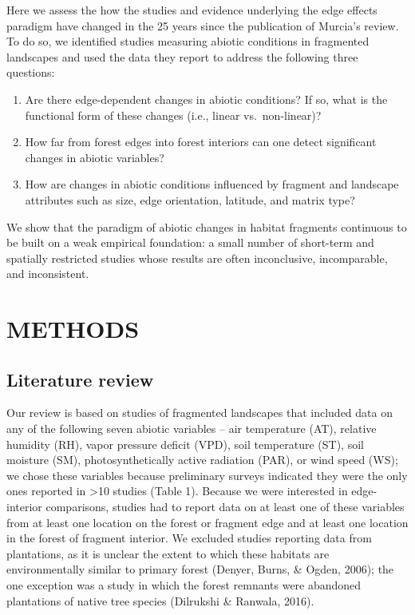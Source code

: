 \documentclass[
  man]{apa6}
\begin{document}
Here we assess the how the studies and evidence underlying the edge effects paradigm have changed in the 25 years since the publication of Murcia's review. To do so, we identified studies measuring abiotic conditions in fragmented landscapes and used the data they report to address the following three questions:\\
\bigskip  

\begin{enumerate}
\def\labelenumi{\arabic{enumi}.}
\item
  Are there edge-dependent changes in abiotic conditions? If so, what is the functional form of these changes (i.e., linear vs.~non-linear)?
\item
  How far from forest edges into forest interiors can one detect significant changes in abiotic variables?
\item
  How are changes in abiotic conditions influenced by fragment and landscape attributes such as size, edge orientation, latitude, and matrix type?
  \bigskip  
\end{enumerate}

We show that the paradigm of abiotic changes in habitat fragments continuous to be built on a weak empirical foundation: a small number of short-term and spatially restricted studies whose results are often inconclusive, incomparable, and inconsistent.

\section{METHODS}\label{methods}

\subsection{Literature review}\label{literature-review}

Our review is based on studies of fragmented landscapes that included data on any of the following seven abiotic variables -- air temperature (AT), relative humidity (RH), vapor pressure deficit (VPD), soil temperature (ST), soil moisture (SM), photosynthetically active radiation (PAR), or wind speed (WS); we chose these variables because preliminary surveys indicated they were the only ones reported in \textgreater10 studies (Table 1). Because we were interested in edge-interior comparisons, studies had to report data on at least one of these variables from at least one location on the forest or fragment edge and at least one location in the forest of fragment interior. We excluded studies reporting data from plantations, as it is unclear the extent to which these habitats are environmentally similar to primary forest (Denyer, Burns, \& Ogden, 2006); the one exception was a study in which the forest remnants were abandoned plantations of native tree species (Dilrukshi \& Ranwala, 2016).
\end{document}
